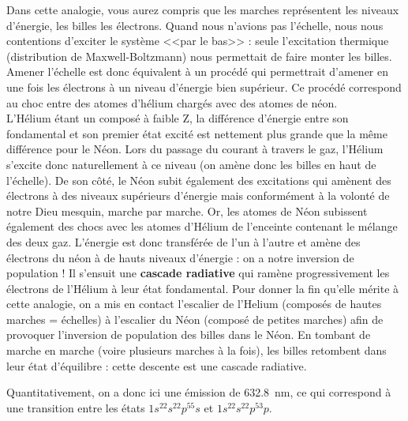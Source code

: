 Dans cette analogie, vous aurez compris que les marches représentent les niveaux d'énergie, les billes les électrons. Quand nous n'avions pas l'échelle, nous nous contentions d'exciter le système <<par le bas>> : seule l'excitation thermique (distribution de Maxwell-Boltzmann) nous permettait de faire monter les billes. Amener l'échelle est donc équivalent à un procédé qui permettrait d'amener en une fois les électrons à un niveau d'énergie bien supérieur. Ce procédé correspond au choc entre des atomes d'hélium chargés avec des atomes de néon.\\

L'Hélium étant un composé à faible Z, la différence d'énergie entre son fondamental et son premier état excité est nettement plus grande que la même différence pour le Néon. Lors du passage du courant à travers le gaz, l'Hélium s'excite donc naturellement à ce niveau (on amène donc les billes en haut de l'échelle). De son côté, le Néon subit également des excitations qui amènent des électrons à des niveaux supérieurs d'énergie mais conformément à la volonté de notre Dieu mesquin, marche par marche. Or, les atomes de Néon subissent également des chocs avec les atomes d'Hélium de l'enceinte contenant le mélange des deux gaz. L'énergie est donc transférée de l'un à l'autre et amène des électrons du néon à de hauts niveaux d'énergie : on a notre inversion de population ! Il s'ensuit une \textbf{cascade radiative} qui ramène progressivement les électrons de l'Hélium à leur état fondamental. Pour donner la fin qu'elle mérite à cette analogie, on a mis en contact l'escalier de l'Helium (composés de hautes marches = échelles) à l'escalier du Néon (composé de petites marches) afin de provoquer l'inversion de population des billes dans le Néon. En tombant de marche en marche (voire plusieurs marches à la fois), les billes retombent dans leur état d'équilibre : cette descente est une cascade radiative.

Quantitativement, on a donc ici une émission de \SI{632.8}{nm}, ce qui correspond à une transition entre les états $1s^22s^22p^55s$ et $1s^22s^22p^53p$.

